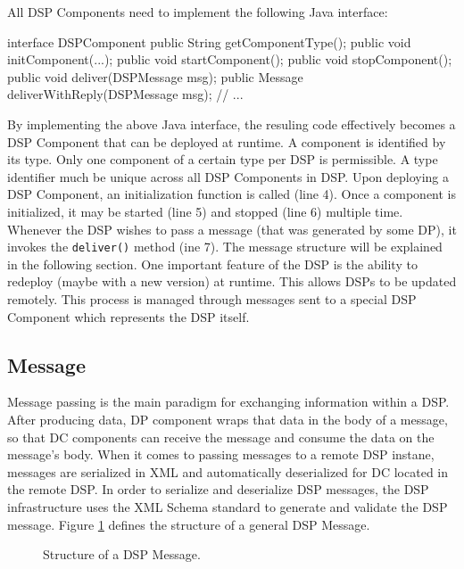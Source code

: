 \documentclass[conference]{IEEEtran}
\begin{document}
All DSP Components need to implement the following Java interface:

\begin{code}
interface DSPComponent
{
   public String getComponentType();
   public void initComponent(...);
   public void startComponent();
   public void stopComponent();
   public void deliver(DSPMessage msg);
   public Message deliverWithReply(DSPMessage msg);
   // ...
}
\end{code}

By implementing the above Java interface, the resuling code
effectively becomes a DSP Component that can be deployed at runtime. A
component is identified by its type. Only one component of a certain type per DSP 
is permissible. A type identifier much be unique across all DSP Components in DSP. 
Upon deploying a DSP Component, an initialization function is called (line 4). Once a
component is initialized, it may be started (line 5) and stopped (line
6) multiple time. Whenever the DSP wishes to pass a message (that was
generated by some DP), it invokes the \texttt{deliver()} method (ine
7). The message structure will be explained in the following section.
One important feature of the DSP is the ability to redeploy (maybe with a new version) at 
runtime. This allows DSPs to be updated remotely. This process is managed through
messages sent to a special DSP Component which represents the DSP itself.

\subsection{Message}

Message passing is the main paradigm for exchanging information within
a DSP. After producing data, DP component wraps that data in the 
body of a message, so that DC components can receive the message and consume 
the data on the message's body. When it comes to passing messages to a remote
DSP instane, messages are serialized in XML \cite{xml2000} and automatically 
deserialized for DC located in the remote DSP. In order to serialize and
deserialize DSP messages, the DSP infrastructure uses the XML Schema 
standard \cite{xml-schema2004} to generate and validate the DSP message. Figure
\ref{FIG_DSP_MESSAGE} defines the structure of a general DSP Message.

\begin{figure}[!htb]
 \centering
 \caption{\label{FIG_DSP_MESSAGE} Structure of a DSP Message.}
\end{figure}
\end{document}
